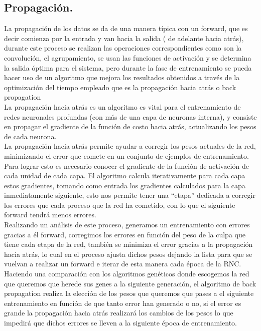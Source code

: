 \documentclass[a4paper, 12pt]{article}
\begin{document}
    \subsection{Propagación.} 
    La propagación de los datos se da de una manera típica con un forward, que es decir comienza por la entrada y van hacia la salida ( de adelante hacia atrás), durante este proceso se realizan las operaciones correspondientes como son la convolución, el agrupamiento, se usan las funciones de activación y se determina la salida óptima para el sistema, pero durante la fase de entrenamiento se pueda hacer uso de un algoritmo que mejora los resultados obtenidos a través de la optimización del tiempo empleado que es la propagación hacia atrás o back propagation\\ 
    La propagación hacia atrás es un algoritmo es vital para el entrenamiento de redes neuronales profundas (con más de una capa de neuronas interna), y consiste en propagar el gradiente de la función de costo hacia atrás, actualizando los pesos de cada neurona.\\ 
    La propagación hacia atrás permite ayudar a corregir los pesos actuales de la red, minimizando el error que comete en un conjunto de ejemplos de entrenamiento. Para lograr esto es necesario conocer el gradiente de la función de activación de cada unidad de cada capa. El algoritmo calcula iterativamente para cada capa estos gradientes, tomando como entrada los gradientes calculados para la capa inmediatamente siguiente, esto nos permite tener una “etapa” dedicada a corregir los errores que cada proceso que la red ha cometido, con lo que el siguiente forward tendrá menos errores.\\ 
    Realizando un análisis de este proceso, generamos un entrenamiento con errores gracias a él forward, corregimos los errores en función del peso de la culpa que tiene cada etapa de la red, también se minimiza el error gracias a la propagación hacia atrás, lo cual en el proceso ajusta dichos pesos dejando la lista para que se vuelvan a realizar un forward e iterar de esta manera cada época de la RNC. Haciendo una comparación con los algoritmos genéticos donde escogemos la red que queremos que herede sus genes a la siguiente generación, el algoritmo de back propagation realiza la elección de los pesos que queremos que pases a el siguiente entrenamiento en función de que tanto error han generado o no, si el error es grande la propagación hacia atrás realizará los cambios de los pesos lo que impedirá que dichos errores se lleven a la siguiente época de entrenamiento. 
\end{document}
